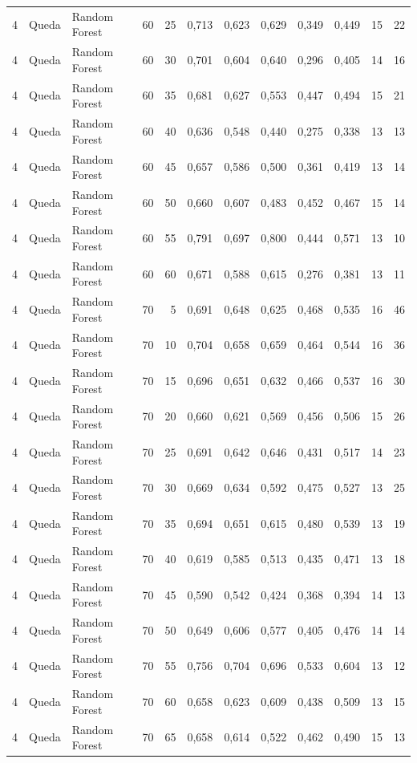 \begin{longtable}{@{}rllrrrrrrrrr@{}}
4 & Queda & Random Forest & 60 & 25 & 0,713 & 0,623 & 0,629 & 0,349 & 0,449 & 15 & 22 \\
4 & Queda & Random Forest & 60 & 30 & 0,701 & 0,604 & 0,640 & 0,296 & 0,405 & 14 & 16 \\
4 & Queda & Random Forest & 60 & 35 & 0,681 & 0,627 & 0,553 & 0,447 & 0,494 & 15 & 21 \\
4 & Queda & Random Forest & 60 & 40 & 0,636 & 0,548 & 0,440 & 0,275 & 0,338 & 13 & 13 \\
4 & Queda & Random Forest & 60 & 45 & 0,657 & 0,586 & 0,500 & 0,361 & 0,419 & 13 & 14 \\
4 & Queda & Random Forest & 60 & 50 & 0,660 & 0,607 & 0,483 & 0,452 & 0,467 & 15 & 14 \\
4 & Queda & Random Forest & 60 & 55 & 0,791 & 0,697 & 0,800 & 0,444 & 0,571 & 13 & 10 \\
4 & Queda & Random Forest & 60 & 60 & 0,671 & 0,588 & 0,615 & 0,276 & 0,381 & 13 & 11 \\
4 & Queda & Random Forest & 70 & 5 & 0,691 & 0,648 & 0,625 & 0,468 & 0,535 & 16 & 46 \\
4 & Queda & Random Forest & 70 & 10 & 0,704 & 0,658 & 0,659 & 0,464 & 0,544 & 16 & 36 \\
4 & Queda & Random Forest & 70 & 15 & 0,696 & 0,651 & 0,632 & 0,466 & 0,537 & 16 & 30 \\
4 & Queda & Random Forest & 70 & 20 & 0,660 & 0,621 & 0,569 & 0,456 & 0,506 & 15 & 26 \\
4 & Queda & Random Forest & 70 & 25 & 0,691 & 0,642 & 0,646 & 0,431 & 0,517 & 14 & 23 \\
4 & Queda & Random Forest & 70 & 30 & 0,669 & 0,634 & 0,592 & 0,475 & 0,527 & 13 & 25 \\
4 & Queda & Random Forest & 70 & 35 & 0,694 & 0,651 & 0,615 & 0,480 & 0,539 & 13 & 19 \\
4 & Queda & Random Forest & 70 & 40 & 0,619 & 0,585 & 0,513 & 0,435 & 0,471 & 13 & 18 \\
4 & Queda & Random Forest & 70 & 45 & 0,590 & 0,542 & 0,424 & 0,368 & 0,394 & 14 & 13 \\
4 & Queda & Random Forest & 70 & 50 & 0,649 & 0,606 & 0,577 & 0,405 & 0,476 & 14 & 14 \\
4 & Queda & Random Forest & 70 & 55 & 0,756 & 0,704 & 0,696 & 0,533 & 0,604 & 13 & 12 \\
4 & Queda & Random Forest & 70 & 60 & 0,658 & 0,623 & 0,609 & 0,438 & 0,509 & 13 & 15 \\
4 & Queda & Random Forest & 70 & 65 & 0,658 & 0,614 & 0,522 & 0,462 & 0,490 & 15 & 13 \\

\end{longtable}

